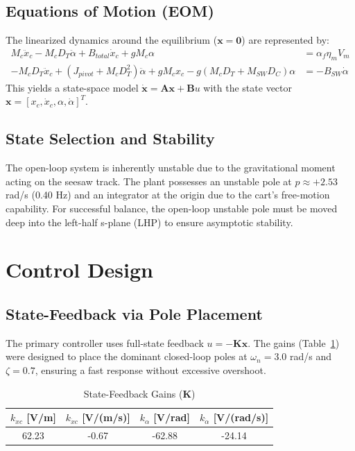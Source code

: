 \documentclass[11pt,a4paper]{article}
\begin{document}
\subsection{Equations of Motion (EOM)}
The linearized dynamics around the equilibrium ($\mathbf{x} = \mathbf{0}$) are represented by:
\begin{align}
    M_c \ddot{x}_c - M_c D_T \ddot{\alpha} + B_{total} \dot{x}_c + g M_c \alpha &= \alpha_f \eta_m V_m \\
    -M_c D_T \ddot{x}_c + (J_{pivot} + M_c D_T^2) \ddot{\alpha} + g M_c x_c - g(M_c D_T + M_{SW} D_C) \alpha &= -B_{SW} \dot{\alpha}
\end{align}
This yields a state-space model $\dot{\mathbf{x}} = \mathbf{A}\mathbf{x} + \mathbf{B}u$ with the state vector $\mathbf{x} = [x_c, \dot{x}_c, \alpha, \dot{\alpha}]^T$.

\subsection{State Selection and Stability}
The open-loop system is inherently unstable due to the gravitational moment acting on the seesaw track. The plant possesses an unstable pole at $p \approx +2.53$ rad/s (0.40 Hz) and an integrator at the origin due to the cart's free-motion capability. For successful balance, the open-loop unstable pole must be moved deep into the left-half s-plane (LHP) to ensure asymptotic stability.

\section{Control Design}

\subsection{State-Feedback via Pole Placement}
The primary controller uses full-state feedback $u = -\mathbf{K}\mathbf{x}$. The gains (Table~\ref{tab:sf_gains}) were designed to place the dominant closed-loop poles at $\omega_n = 3.0$ rad/s and $\zeta = 0.7$, ensuring a fast response without excessive overshoot.

\begin{table}[H]
    \centering
    \caption{State-Feedback Gains ($\mathbf{K}$)}
    \label{tab:sf_gains}
    \begin{tabular}{c c c c}
        \toprule
        $k_{xc}$ [V/m] & $k_{\dot{x}c}$ [V/(m/s)] & $k_{\alpha}$ [V/rad] & $k_{\dot{\alpha}}$ [V/(rad/s)] \\
        \midrule
        62.23 & -0.67 & -62.88 & -24.14 \\
        \bottomrule
    \end{tabular}
\end{table}
\end{document}
